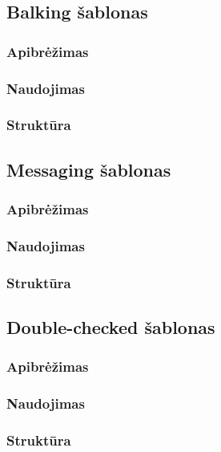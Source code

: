 \documentclass[10pt]{IEEEtran}
\begin{document}
		\subsection{Balking šablonas}

			\subsubsection{Apibrėžimas}

			\subsubsection{Naudojimas}

			\subsubsection{Struktūra}

		\subsection{Messaging šablonas}

			\subsubsection{Apibrėžimas}

			\subsubsection{Naudojimas}

			\subsubsection{Struktūra}

		\subsection{Double-checked šablonas}

			\subsubsection{Apibrėžimas}

			\subsubsection{Naudojimas}

			\subsubsection{Struktūra}
\end{document}
